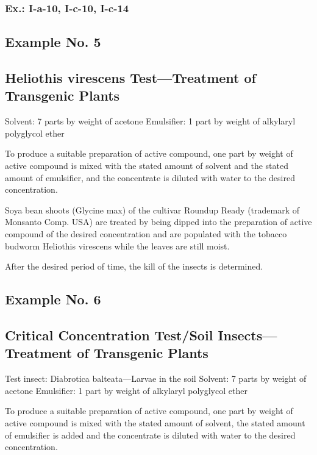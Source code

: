 \documentclass[11pt,a4paper]{article}
\begin{document}
\subsubsection{Ex.: I-a-10, I-c-10, I-c-14}

\subsection{Example No. 5}

\subsection{Heliothis virescens Test—Treatment of Transgenic Plants}

Solvent: 7 parts by weight of acetone Emulsifier: 1 part by weight of alkylaryl polyglycol ether

To produce a suitable preparation of active compound, one part by weight of active compound is mixed with the stated amount of solvent and the stated amount of emulsifier, and the concentrate is diluted with water to the desired concentration.

Soya bean shoots (Glycine max) of the cultivar Roundup Ready (trademark of Monsanto Comp. USA) are treated by being dipped into the preparation of active compound of the desired concentration and are populated with the tobacco budworm Heliothis virescens while the leaves are still moist.

After the desired period of time, the kill of the insects is determined.

\subsection{Example No. 6}

\subsection{Critical Concentration Test/Soil Insects—Treatment of Transgenic Plants}

Test insect: Diabrotica balteata—Larvae in the soil Solvent: 7 parts by weight of acetone Emulsifier: 1 part by weight of alkylaryl polyglycol ether

To produce a suitable preparation of active compound, one part by weight of active compound is mixed with the stated amount of solvent, the stated amount of emulsifier is added and the concentrate is diluted with water to the desired concentration.
\end{document}
